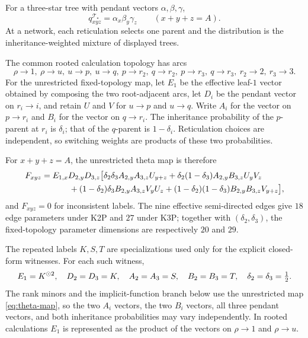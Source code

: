 \documentclass[11pt]{article}
\theoremstyle{remark}\newtheorem{remark}[theorem]{Remark}
\newcommand{\Tstar}{\mathcal T_\star}\newcommand{\Ntheta}{\mathcal N_\theta}
\begin{document}
For a three-star tree with pendant vectors $\alpha,\beta,\gamma$,
\[
q^{\Tstar}_{xyz}=\alpha_x\beta_y\gamma_z\qquad(x+y+z=A).
\]
At a network, each reticulation selects one parent and the distribution is the inheritance-weighted mixture of displayed trees.

The common rooted calculation topology has arcs
\begin{equation}\label{eq:arcs}
\rho\to1,\ \rho\to u,\ u\to p,\ u\to q,\ p\to r_2,\ q\to r_2,\ p\to r_3,\ q\to r_3,\ r_2\to2,\ r_3\to3.
\end{equation}
For the unrestricted fixed-topology map, let $E_1$ be the effective leaf-$1$ vector obtained by composing the two root-adjacent arcs, let $D_i$ be the pendant vector on $r_i\to i$, and retain $U$ and $V$ for $u\to p$ and $u\to q$. Write $A_i$ for the vector on $p\to r_i$ and $B_i$ for the vector on $q\to r_i$. The inheritance probability of the $p$-parent at $r_i$ is $\delta_i$; that of the $q$-parent is $1-\delta_i$. Reticulation choices are independent, so switching weights are products of these two probabilities.

For $x+y+z=A$, the unrestricted theta map is therefore
\begin{align}\label{eq:theta-map}
F_{xyz}={}&E_{1,x}D_{2,y}D_{3,z}\bigl[
\delta_2\delta_3 A_{2,y}A_{3,z}U_{y+z}
+\delta_2(1-\delta_3)A_{2,y}B_{3,z}U_yV_z\notag\\
&\qquad +(1-\delta_2)\delta_3B_{2,y}A_{3,z}V_yU_z
+(1-\delta_2)(1-\delta_3)B_{2,y}B_{3,z}V_{y+z}\bigr],
\end{align}
and $F_{xyz}=0$ for inconsistent labels. The nine effective semi-directed edges give $18$ edge parameters under K2P and $27$ under K3P; together with $(\delta_2,\delta_3)$, the fixed-topology parameter dimensions are respectively $20$ and $29$.

The repeated labels $K,S,T$ are specializations used only for the explicit closed-form witnesses. For each such witness,
\[
E_1=K^{\mathbin{\odot}2},\quad D_2=D_3=K,\quad A_2=A_3=S,\quad B_2=B_3=T,
\quad\delta_2=\delta_3=\tfrac12.
\]
The rank minors and the implicit-function branch below use the unrestricted map \eqref{eq:theta-map}, so the two $A_i$ vectors, the two $B_i$ vectors, all three pendant vectors, and both inheritance probabilities may vary independently. In rooted calculations $E_1$ is represented as the product of the vectors on $\rho\to1$ and $\rho\to u$.
\end{document}
